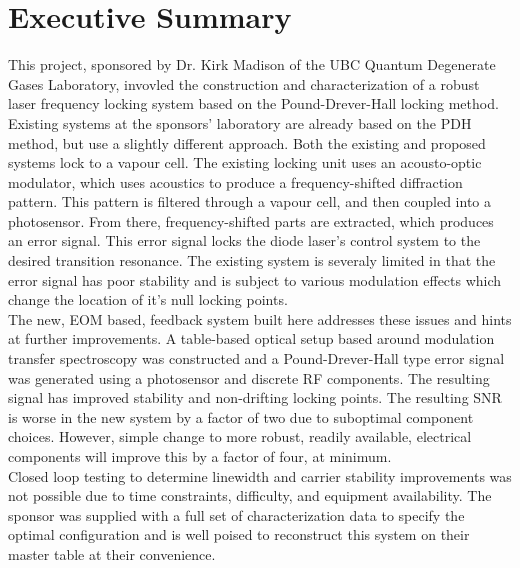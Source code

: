 \newpage
\section*{Executive Summary}

This project, sponsored by Dr. Kirk Madison of the UBC Quantum Degenerate Gases Laboratory, invovled the construction and characterization of a robust laser frequency locking system based on the Pound-Drever-Hall locking method. \\

Existing systems at the sponsors' laboratory are already based on the PDH method, but use a slightly different approach.  Both the existing and proposed systems lock to a vapour cell.  The existing locking unit uses an acousto-optic modulator, which uses acoustics to produce a frequency-shifted diffraction pattern.  This pattern is filtered through a vapour cell, and then coupled into a photosensor.  From there, frequency-shifted parts are extracted, which produces an error signal.  This error signal locks the diode laser's control system to the desired transition resonance. The existing system is severaly limited in that the error signal has poor stability and is subject to various modulation effects which change the location of it's null locking points. \\

The new, EOM based, feedback system built here addresses these issues and hints at further improvements. A table-based optical setup based around modulation transfer spectroscopy was constructed and a Pound-Drever-Hall type error signal was generated using a photosensor and discrete RF components. The resulting signal has improved stability and non-drifting locking points. The resulting SNR is worse in the new system by a factor of two due to suboptimal component choices. However, simple change to more robust, readily available, electrical components will improve this by a factor of four, at minimum. \\

Closed loop testing to determine linewidth and carrier stability improvements was not possible due to time constraints, difficulty, and equipment availability. The sponsor was supplied with a full set of characterization data to specify the optimal configuration and is well poised to reconstruct this system on their master table at their convenience.

